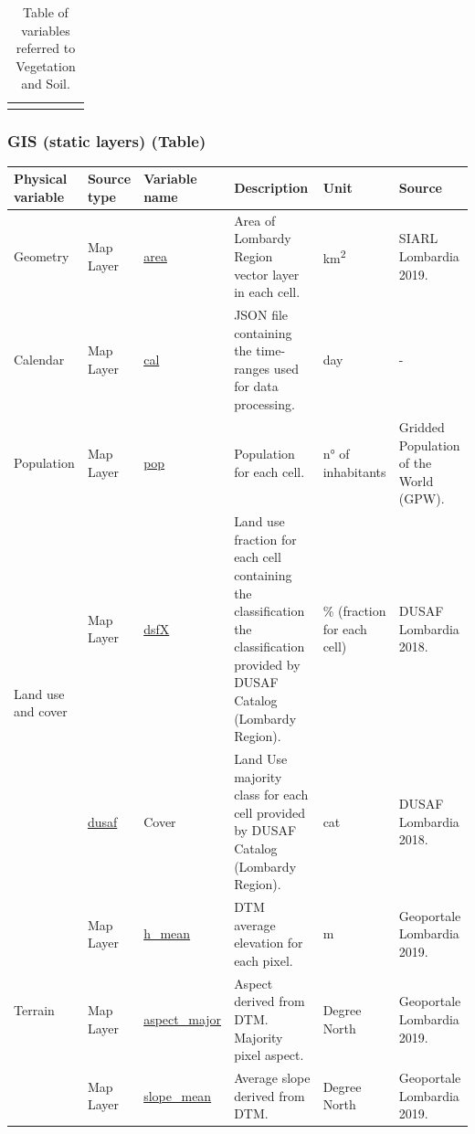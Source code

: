 \begin{center}
\begin{longtable}{ |p{2cm}|p{1.5cm}|p{2.3cm}|p{4cm}|p{1cm}|p{2cm}| }
\hline
\caption{Table of variables referred to Vegetation and Soil.}

\end{longtable}
\end{center}

\subsubsection{GIS (static layers) (Table)}

\begin{center}
\setlength{\arrayrulewidth}{1.5pt}
\begin{longtable}{ |p{2.1cm}|p{1.5cm}|p{2.3cm}|p{4cm}|p{1.5cm}|p{2cm}| } 
\hline
\textbf{Physical variable} & \textbf{Source type}  & \textbf{Variable name}  & \textbf{Description}  & \textbf{Unit}  & \textbf{Source}\\ 
\hline
\multirow{1}{4em}{Geometry} & Map Layer  & \underline{area} & Area of Lombardy Region vector layer in each cell. \par& km\textsuperscript{2} & SIARL Lombardia 2019.\\ 
\hline
\multirow{1}{4em}{Calendar} & Map Layer  & \underline{cal} & JSON file containing the time-ranges used for data processing. \par& day & -\\ 
\hline

\multirow{1}{4em}{Population} & Map Layer  & \underline{pop} & Population for each cell. & n° of inhabitants& Gridded Population of the World (GPW).\\ \hline

\multirow{2}{4em}{Land use and cover} & Map Layer  & \underline{dsfX} & Land use fraction for each cell containing the classification the classification provided by DUSAF Catalog (Lombardy Region). & \% (fraction for each cell) & DUSAF Lombardia 2018.\\ \hline
Map Layer  & \underline{dusaf} & Cover & Land Use majority class for each cell provided by DUSAF Catalog (Lombardy Region). & cat  & DUSAF Lombardia 2018.\\
\hline

\multirow{3}{4em}{Terrain} & Map Layer  & \underline{h\_mean} & DTM average elevation for each pixel. & m & Geoportale Lombardia 2019.\\ 
& Map Layer  & \underline{aspect\_major} & Aspect derived from DTM. Majority pixel aspect. & Degree North & Geoportale Lombardia 2019.\\ 
& Map Layer  & \underline{slope\_mean} & Average slope derived from DTM. & Degree North & Geoportale Lombardia 2019.\\ 


\end{longtable}
\end{center}
